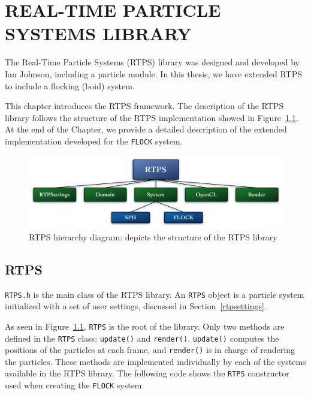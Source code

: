 \chapter{REAL-TIME PARTICLE SYSTEMS LIBRARY}\label{RTPSchapter}

The Real-Time Particle Systems (RTPS) library was designed and developed by Ian Johnson\cite{ianPaper}, including a particle module. In this thesis, we have extended RTPS to include a flocking (boid) system. 

This chapter introduces the RTPS framework. The description of the RTPS library follows the structure of the RTPS implementation showed in Figure~\ref{RTPSdiagram}. At the end of the Chapter, we provide a detailed description of the extended implementation developed for the \texttt{FLOCK} system. 

\begin{figure}[htbp]
\begin{center}
\includegraphics[scale=0.30]{figures/RTPSdiagramMyrna.pdf}
\caption{RTPS hierarchy diagram: depicts the structure of the RTPS library}
\label{RTPSdiagram}
\end{center}
\end{figure}

\section{RTPS}\label{rtpssection}
\texttt{RTPS.h} is the main class of the RTPS library. An \texttt{RTPS} 
object is a particle system initialized with a 
set of user settings,  discussed in Section~\ref{rtpsettings}. 

As seen in Figure~\ref{RTPSdiagram}, \texttt{RTPS} is the root of the library. 
Only two methods are defined in the \texttt{RTPS} class: \texttt{update()} and \texttt{render()}. \texttt{update()} computes the positions of the particles at each frame, and \texttt{render()} is in charge of rendering the particles. These methods are implemented individually by each of the systems available in the RTPS library. The following code shows the \texttt{RTPS} constructor used when creating the \texttt{FLOCK} system.

